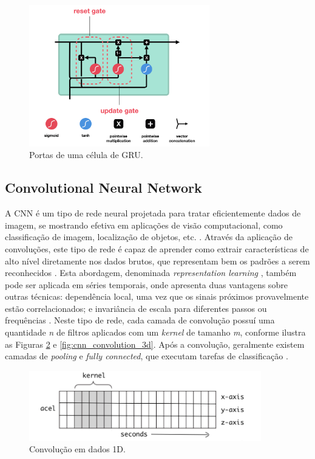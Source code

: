 \begin{figure}[h]
  \centering
  \caption{Portas de uma célula de GRU.}
   \label{fig:cell_gru_gates}
   \includegraphics[width=0.7\textwidth]{figuras/fig_10.png}
\end{figure}

\subsection{Convolutional Neural Network}

A CNN é um tipo de rede neural projetada para tratar eficientemente dados de imagem, se mostrando efetiva em aplicações de visão computacional, como classificação de imagem, localização de objetos, etc. \cite{Brownlee2018}. Através da aplicação de convoluções, este tipo de rede é capaz de aprender como extrair características de alto nível diretamente nos dados brutos, que representam bem os padrões a serem reconhecidos \cite{Dixon2019,Goodfellow2016}. Esta abordagem, denominada \textit{representation learning} \cite{Brownlee2018}, também pode ser aplicada em séries temporais, onde apresenta duas vantagens sobre outras técnicas: dependência local, uma vez que os sinais próximos provavelmente estão correlacionados; e invariância de escala para diferentes passos ou frequências \cite{Wang2019}. Neste tipo de rede, cada camada de convolução possuí uma quantidade \emph{n} de filtros aplicados com um \textit{kernel} de tamanho \emph{m}, conforme ilustra as Figuras \ref{fig:cnn_convolution} e \ref{fig:cnn_convolution_3d}. Após a convolução, geralmente existem camadas de \textit{pooling} e \textit{fully connected}, que executam tarefas de classificação \cite{Wang2019}.

\begin{figure}[h]
  \centering
  \caption{Convolução em dados 1D.}
   \label{fig:cnn_convolution}
   \includegraphics[width=0.9\textwidth]{figuras/fig_11.png}
\end{figure}

